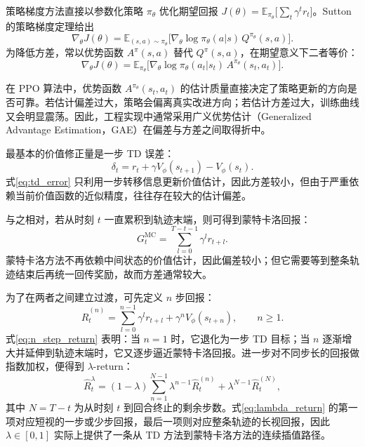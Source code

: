 \documentclass[12pt,a4paper]{ctexart}
\numberwithin{equation}{section}
\numberwithin{table}{section}
\numberwithin{figure}{section}
\newcommand{\subtopic}[1]{\par\addvspace{0.2\baselineskip}\ignorespaces}
\begin{document}
\subtopic{策略梯度定理}
策略梯度方法直接以参数化策略 $\pi_\theta$ 优化期望回报 $J(\theta)=\mathbb{E}_{\pi_\theta}\bigl[\sum_t\gamma^t r_t\bigr]$。Sutton 的策略梯度定理给出
\begin{equation}
\nabla_\theta J(\theta)=\mathbb{E}_{(s,a)\sim\pi_\theta}\bigl[\nabla_\theta\log\pi_\theta(a|s)\,Q^{\pi_\theta}(s,a)\bigr].
\end{equation}
为降低方差，常以优势函数 $A^{\pi}(s,a)$ 替代 $Q^{\pi}(s,a)$，在期望意义下二者等价：
\begin{equation}
\nabla_\theta J(\theta)=\mathbb{E}_{\pi_\theta}\bigl[\nabla_\theta\log\pi_\theta(a_t|s_t)\,A^{\pi_\theta}(s_t,a_t)\bigr].
\end{equation}

\subtopic{广义优势估计}
在 PPO 算法中，优势函数 $A^{\pi_\theta}(s_t,a_t)$ 的估计质量直接决定了策略更新的方向是否可靠。若估计偏差过大，策略会偏离真实改进方向；若估计方差过大，训练曲线又会明显震荡。因此，工程实现中通常采用广义优势估计（Generalized Advantage Estimation，GAE）在偏差与方差之间取得折中。

最基本的价值修正量是一步 TD 误差：
\begin{equation}
\delta_t=r_t+\gamma V_\phi(s_{t+1})-V_\phi(s_t).
\label{eq:td_error}
\end{equation}
式\eqref{eq:td_error} 只利用一步转移信息更新价值估计，因此方差较小，但由于严重依赖当前价值函数的近似精度，往往存在较大的估计偏差。

与之相对，若从时刻 $t$ 一直累积到轨迹末端，则可得到蒙特卡洛回报：
\begin{equation}
G_t^{\mathrm{MC}}=\sum_{l=0}^{T-t-1}\gamma^l r_{t+l}.
\label{eq:mc_return}
\end{equation}
蒙特卡洛方法不再依赖中间状态的价值估计，因此偏差较小；但它需要等到整条轨迹结束后再统一回传奖励，故而方差通常较大。

为了在两者之间建立过渡，可先定义 $n$ 步回报：
\begin{equation}
\hat{R}_t^{(n)}=\sum_{l=0}^{n-1}\gamma^l r_{t+l}+\gamma^n V_\phi(s_{t+n}),\qquad n\ge 1.
\label{eq:n_step_return}
\end{equation}
式\eqref{eq:n_step_return} 表明：当 $n=1$ 时，它退化为一步 TD 目标；当 $n$ 逐渐增大并延伸到轨迹末端时，它又逐步逼近蒙特卡洛回报。进一步对不同步长的回报做指数加权，便得到 $\lambda$-return：
\begin{equation}
\hat{R}_t^{\lambda}=(1-\lambda)\sum_{n=1}^{N-1}\lambda^{n-1}\hat{R}_t^{(n)}+\lambda^{N-1}\hat{R}_t^{(N)},
\label{eq:lambda_return}
\end{equation}
其中 $N=T-t$ 为从时刻 $t$ 到回合终止的剩余步数。式\eqref{eq:lambda_return} 的第一项对应短视的一步或少步回报，最后一项则对应整条轨迹的长视回报，因此 $\lambda\in[0,1]$ 实际上提供了一条从 TD 方法到蒙特卡洛方法的连续插值路径。
\end{document}
